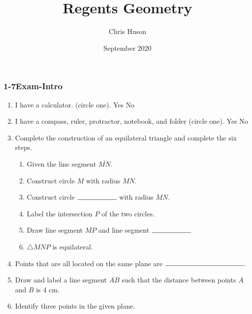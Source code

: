 \documentclass[12pt, twoside]{article}
\title{Regents Geometry}
\author{Chris Huson}
\date{September 2020}
\begin{document}
\subsubsection*{1-7Exam-Intro}
\begin{enumerate}
\item I have a calculator. (circle one). Yes \qquad No
\item I have a compass, ruler, protractor, notebook, and folder (circle one). Yes \qquad No
\vspace{0.5cm}
\item Complete the construction of an equilateral triangle and complete the six steps.
  \begin{enumerate}
    \item Given the line segment $\overline{MN}$.
    \bigskip
    \item Construct circle $M$ with radius $MN$.
    \bigskip
    \item Construct circle $\rule{2cm}{0.15mm}$  with radius $MN$. \bigskip
    \item Label the intersection $P$ of the two circles.
    \bigskip
    \item Draw line segment $\overline{MP}$ and line segment $\rule{2cm}{0.15mm}$
    \bigskip
    \item $\triangle MNP$ is equilateral.
  \end{enumerate}
  \vspace{7cm}
  \begin{center}
  \end{center}

\newpage
\item Points that are all located on the same plane are $\rule{4cm}{0.15mm}$.\bigskip

\item Draw and label a line segment $\overline{AB}$ such that the distance between points $A$ and $B$ is 4 cm. 
  \vspace{3cm}

\item Identify three points in the given plane.\\[0.25in]
     \vspace{1cm}


\end{enumerate}
\end{document}
